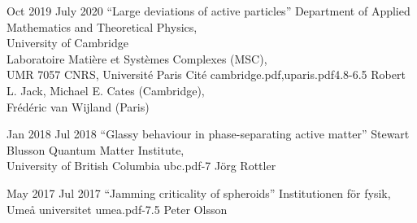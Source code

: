 \documentclass[a4paper]{cvtemplate_en} %
\begin{document}
\begin{cvbody}

\cvitem
	{Oct 2019}
	{July 2020}
  {``Large deviations of active particles''}
  {Department of Applied Mathematics and Theoretical Physics,\\ University of Cambridge \\
	Laboratoire Mati\`ere et Syst\`emes Complexes (MSC),\\ UMR 7057 CNRS, Universit\'e Paris Cit\'e }
  {cambridge.pdf,uparis.pdf}{4.8}{-6.5}
	{Robert L. Jack, Michael E. Cates (Cambridge),\\ Fr\'ed\'eric van Wijland (Paris)}
  {\\}

\cvitem
	{Jan 2018}
	{Jul 2018}
  {``Glassy behaviour in phase-separating active matter''}
  {Stewart Blusson Quantum Matter Institute,\\ University of British Columbia }
  {ubc.pdf}{}{-7}
  {J\"org Rottler}
  {\\
  }

\cvitem
	{May 2017}
	{Jul 2017}
	{``Jamming criticality of spheroids''}
	{Institutionen f\"{o}r fysik, Ume\r{a} universitet }
	{umea.pdf}{}{-7.5}
	{Peter Olsson}
	{\\
	}


\end{cvbody}
\end{document}
